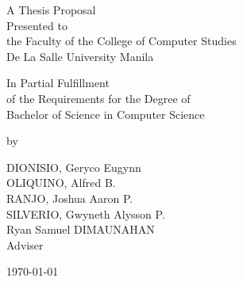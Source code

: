 %
%
%                 

\begin{titlepage}
\centering



\vspace{1.75cm}
A Thesis Proposal\\
Presented to\\
the Faculty of the College of Computer Studies\\
De La Salle University Manila

\vspace{1.75cm}
In Partial Fulfillment\\
of the Requirements for the Degree of\\
Bachelor of  Science in Computer Science

\vspace{1.75cm}
by\\
\vspace{1cm}

DIONISIO, Geryco Eugynn \\
OLIQUINO, Alfred B.  \\
RANJO, Joshua Aaron P.  \\
SILVERIO, Gwyneth Alysson P.  \\

\vspace{1.75cm}
Ryan Samuel DIMAUNAHAN \\
Adviser

\vspace{1.75cm}
\today
\end{titlepage}

